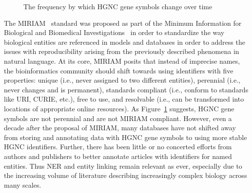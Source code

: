 \begin{figure}
    \captionsetup{format=plain}
    \caption[HGNC Gene Symbol Half Lives]{The frequency by which \ac{HGNC} gene symbols change over time}
    \label{fig:gene_symbol_half_life}
\end{figure}

The \ac{MIRIAM}~\cite{Laibe2007} standard was proposed as part of the Minimum Information for Biological and Biomedical Investigations~\cite{Taylor2008} in order to standardize the way biological entities are referenced in models and databases in order to address the issues with reproducibility arising from the previously described phenomena in natural language.
At its core, \ac{MIRIAM} posits that instead of imprecise names, the bioinformatics community should shift towards using identifiers with five properties: unique (i.e., never assigned to two different entities), perennial (i.e., never changes and is permanent), standards compliant (i.e., conform to standards like \ac{URI}, \ac{CURIE}, etc.), free to use, and resolvable (i.e., can be transformed into locations of appropriate online resources).
As Figure~\ref{fig:gene_symbol_half_life} suggests, \ac{HGNC} gene symbols are not perennial and are not \ac{MIRIAM} compliant.
However, even a decade after the proposal of \ac{MIRIAM}, many databases have not shifted away from storing and annotating data with \ac{HGNC} gene symbols to using more stable \ac{HGNC} identifiers.
Further, there has been little or no concerted efforts from authors and publishers to better annotate articles with identifiers for named entities.
Thus \ac{NER} and entity linking remain relevant as ever, especially due to the increasing volume of literature describing increasingly complex biology across many scales.

